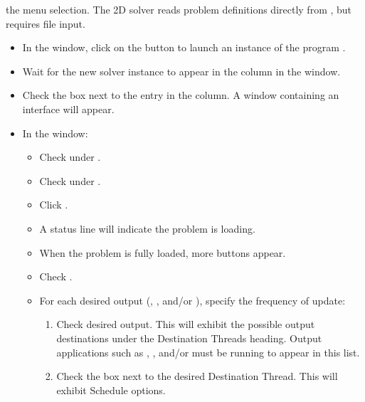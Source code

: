 \begin{list}{}{\setlength{\labelwidth}{0pt}
               \setlength{\leftmargin}{0pt}
               \setlength{\rightmargin}{\leftmargin}
               \setlength{\itemsep}{0pt}}
\begin{description}
\begin{itemize}
            the  menu selection. The 2D
            solver  reads problem definitions directly
            from , but  requires file input.
    \end{itemize}
    \item[Initialize solver:]\blankspace
    \begin{itemize}
      \item In the  window, click on the 
            button to launch an instance of the program
            .
      \item Wait for the new solver instance to appear in the 
           column in the  window.
      \item Check the box next to the  entry in the
          column.  A window containing an  interface
          will appear.
      \item In the  window:
      \begin{itemize}
        \item Check  under .
        \item Check  under .
        \item Click .
        \item A status line will indicate the problem is loading.
        \item When the problem is fully loaded, more buttons appear.
        \item Check .
        \item For each desired output (, , 
          and/or ), specify the frequency of update:
        \begin{enumerate}
          \item Check desired output.  This will exhibit the possible
                output destinations under the Destination Threads
                heading.  Output applications such as ,
                , and/or  must be running
                to appear in this list.
          \item Check the box next to the desired Destination Thread.  
                This will exhibit Schedule options.

\end{enumerate}
\end{itemize}
\end{itemize}
\end{description}
\end{list}
